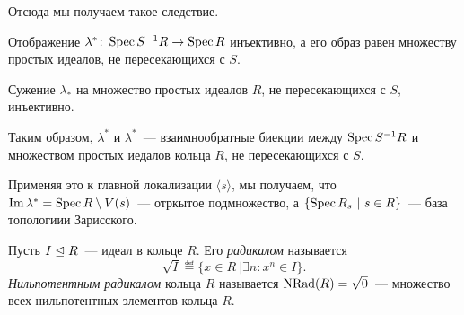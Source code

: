 	Отсюда мы получаем такое следствие. 

	\begin{corollary}
		Отображение $\lambda^*\colon \operatorname{Spec}{S^{-1}R} \to \operatorname{Spec}{R}$ инъективно, а его образ равен множеству простых идеалов, не пересекающихся с $S$. 

		Сужение $\lambda_*$ на множество простых идеалов $R$, не пересекающихся с $S$, инъективно.

		Таким образом, $\lambda^{*}$ и $\lambda^{*}$~--- взаимнообратные биекции между $\operatorname{Spec}{S^{-1}R}$ и множеством простых иедалов кольца $R$, не пересекающихся с $S$.
	\end{corollary}

	Применяя это к главной локализации $\langle s \rangle$, мы получаем, что $\mathop{\mathrm{Im}}\nolimits{\lambda^{*}} = \operatorname{Spec}{R}\setminus V(s)$~--- отркытое подмножество, а  $\{ \operatorname{Spec}{R_{s}} \ \vert \ s \in R\}$~--- база топологиии Зарисского. 

	\begin{definition} 
		Пусть $I \trianglelefteq R$~--- идеал в кольце $R$. Его \emph{радикалом} называется 
		\[
			\sqrt{I} \eqdef \{x \in R \ \vert \exists n \colon x^n \in I  \}.
		\]
		\emph{Нильпотентным радикалом} кольца $R$ называется $\operatorname{NRad}(R) = \sqrt{0}$~---  множество всех нильпотентных элементов кольца $R$. 
	\end{definition}

